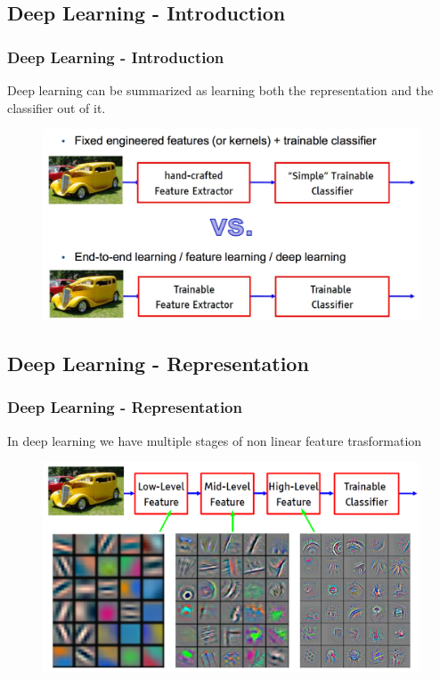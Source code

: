 \documentclass[professionalfont]{beamer}
\begin{document}
  \subsection{Deep Learning - Introduction}
  \begin{frame}
    \frametitle{Deep Learning - Introduction}
    Deep learning can be summarized as learning both the representation and the classifier out of it.
    \begin{figure}
      \centering
      \includegraphics[scale=0.4]{deep1.png}
      \label{}
    \end{figure}
  \end{frame}

  \subsection{Deep Learning - Representation}
  \begin{frame}
    \frametitle{Deep Learning - Representation}
    In deep learning we have multiple stages of non linear feature trasformation
    \begin{figure}
      \centering
      \includegraphics[scale=0.4]{deep2.png}
      \label{}
    \end{figure}
  \end{frame}
\end{document}
